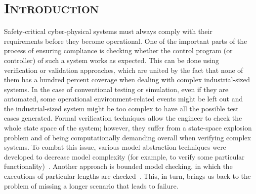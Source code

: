 \documentclass[conference]{IEEEtran}
\newif\ifcomments
\newcommand{\commentColor}[3]{\ifcomments
\textcolor{#3}{[\textbf{#1:} #2]}
\fi}
\newcommand{\PO}[1]{\commentColor{PO}{#1}{orange}}
\begin{document}



\section{\textsc{Introduction}}




Safety-critical cyber-physical systems must always comply with their requirements before they become operational. One of the important parts of the process of ensuring compliance is checking whether the control program (or controller) of such a system works as expected. This can be done using verification or validation approaches, which are united by the fact that none of them has a hundred percent coverage when dealing with complex industrial-sized systems. In the case of conventional testing or simulation, even if they are automated, some operational environment-related events might be left out and the industrial-sized system might be too complex to have all the possible test cases generated. Formal verification techniques allow the engineer to check the whole state space of the system; however, they suffer from a state-space explosion problem and of being computationally demanding overall when verifying complex systems. To combat this issue, various model abstraction techniques were developed to decrease model complexity (for example, to verify some particular functionality)~\cite{clarke2000,burch1992symbolic}. Another approach is bounded model checking, in which the executions of particular lengths are checked~\cite{biere2003bounded}. This, in turn, brings us back to the problem of missing a longer scenario that leads to failure.
\end{document}

